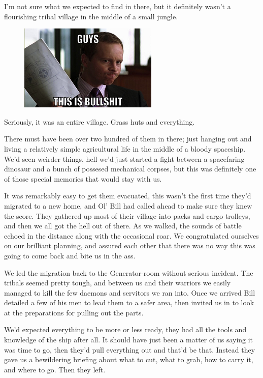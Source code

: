 I’m not sure what we expected to find in there, but it definitely wasn’t a flourishing tribal village in the middle of a small jungle.

\begin{figure}
	\begin{center}
		\includegraphics[width=\figwidth]{pics/7/31.png}
	\end{center}
\end{figure}
Seriously, it was an entire village. 
Grass huts and everything. 


There must have been over two hundred of them in there; 
just hanging out and living a relatively simple agricultural life in the middle of a bloody spaceship. 
We’d seen weirder things, hell we’d just started a fight between a spacefaring dinosaur and a bunch of possesed mechanical corpses, but this was definitely one of those special memories that would stay with us.

It was remarkably easy to get them evacuated, this wasn’t the first time they’d migrated to a new home, and Ol’ Bill had called ahead to make sure they knew the score. 
They gathered up most of their village into packs and cargo trolleys, and then we all got the hell out of there. 
As we walked, the sounds of battle echoed in the distance along with the occasional roar. 
We congratulated ourselves on our brilliant planning, and assured each other that there was no way this was going to come back and bite us in the ass.

We led the migration back to the Generator-room without serious incident. 
The tribals seemed pretty tough, and between us and their warriors we easily managed to kill the few daemons and servitors we ran into. 
Once we arrived Bill detailed a few of his men to lead them to a safer area, then invited us in to look at the preparations for pulling out the parts.

We’d expected everything to be more or less ready, they had all the tools and knowledge of the ship after all. 
It should have just been a matter of us saying it was time to go, then they’d pull everything out and that’d be that. 
Instead they gave us a bewildering briefing about what to cut, what to grab, how to carry it, and where to go. 
Then they left.

